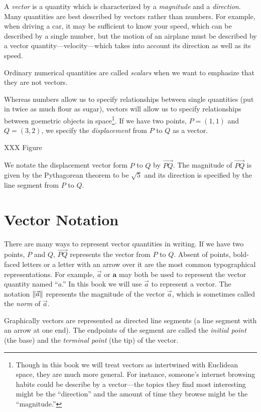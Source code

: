 A \emph{vector} is a quantity which is characterized by
a \emph{magnitude} and a \emph{direction}.   Many quantities are best
described by vectors rather than
numbers.  For example, when driving a car,
 it may be sufficient to
know your speed, which can be described by a single number,
 but the motion of an airplane must be described
by a vector quantity---velocity---which takes into account its
direction as well as its speed.

Ordinary numerical quantities are called \emph{scalars}
when we want to emphasize that they are not vectors.

Whereas numbers allow us to specify relationships between single quantities
(put in twice as much flour as sugar), vectors will allow us to specify
relationships between goemetric objects in space\footnote{
	Though in this book we will treat vectors as intertwined with Euclidean
	space, they are much more general.  For instance, someone's internet
	browsing habits could be describe by a vector---the topics they
	find most interesting might be the ``direction'' and the amount
	of time they browse might be the ``magnitude.''
}.  If we have two points, $P=(1,1)$ and $Q=(3,2)$, we specify the
\emph{displacement} from $P$ to $Q$ as a vector.

XXX Figure

We notate the displacement vector form $P$ to $Q$ by $\overrightarrow{PQ}$.
The magnitude of $\overrightarrow{PQ}$ is given by the Pythagorean theorem
to be $\sqrt{5}$ and its direction is specified by the line segment from
$P$ to $Q$.


\section{Vector Notation}
There are many ways to represent vector quantities in writing.  If
we have two points, $P$ and $Q$, $\overrightarrow{PQ}$ represents the
vector from $P$ to $Q$.  Absent of points, bold-faced letters or a letter
with an arrow over it are the most common typographical representations.
For example, $\vec a$ or $\mathbf{a}$ may both be used to represent the vector
quantity named ``$a$.''  In this book we will use $\vec a$ to represent a vector.
The notation $\lVert\vec a\rVert$\index{$\norm{\:\cdot\:}$}
represents the magnitude of the vector $\vec a$, which is sometimes called
the \emph{norm} of $\vec a$.

Graphically vectors are represented as directed line segments (a
line segment with an arrow at one end).  The endpoints of the segment are called the 
\emph{initial
point} (the base) and the \emph{terminal point} (the tip) of the vector.

